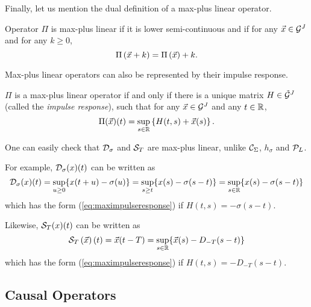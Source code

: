 Finally, let us mention the dual definition of a max-plus linear operator.


\begin{definition}
Operator $\Pi$ is max-plus linear if it is lower semi-continuous and if for any $\vec{x} \in \mathcal G^J$ and for any $k \geq 0$,
\begin{equation}
\mylabel{eq:linearityagain}
\Pi \left( \vec{x} + k \right) =  \Pi \left( \vec{x} \right) + k.
\end{equation}
\end{definition}


Max-plus linear operators can also be represented by their impulse response.

\begin{theorem}
 $\Pi$ is a max-plus linear
operator if and only if there is a unique matrix $H \in
\tilde{\mathcal G}^J$ (called the {\em impulse response}), such that
for any $\vec{x} \in \mathcal G^J$ and any $t \in \mathbb{R}$,
\begin{equation}
\mylabel{eq:maximpulseresponse}
\Pi(\vec{x})(t) = \sup_{s \in \Reals} \left\{ H(t,s) + \vec{x}(s) \right\}.
\end{equation}
\end{theorem}

One can easily check that $\mathcal D_{\sigma}$ and $\mathcal S_T$ are
max-plus linear, unlike  $\mathcal C_{\Sigma}$, $h_\sigma$ and
$\mathcal P_L$.

For example, $\mathcal D_{\sigma}(x)(t)$ can be written as
$$ \mathcal D_{\sigma}(x)(t) =  \sup_{u \geq 0} \{ x(t+u) - \sigma(u) \} = \sup_{s \geq t} \{ x(s) - \sigma(s-t) \} = \sup_{s \in \mathbb{R}} \{ x(s) - \sigma(s-t) \} $$
which has the form (\ref{eq:maximpulseresponse}) if $H(t,s) = - \sigma(s-t)$.

Likewise, $\mathcal S_T(x)(t)$ can be written as
$$ \mathcal S_{T}\left( \vec{x} \right) (t) = \vec{x}(t-T) = \sup_{s \in \mathbb{R}} \{ \vec{x}(s) - D_{-T}(s-t) \} $$
which has the form (\ref{eq:maximpulseresponse}) if $H(t,s) = - D_{-T}(s-t)$.




\subsection{Causal Operators}

